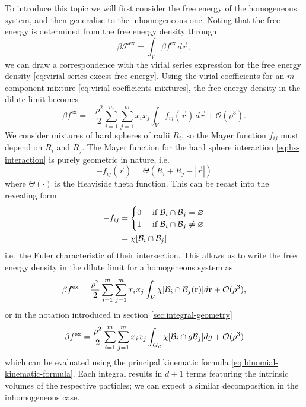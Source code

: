 To introduce this topic we will first consider the free energy of the homogeneous system, and then generalise to the inhomogeneous one.
Noting that the free energy is determined from the free energy density through
\begin{equation*}
  \beta \mathcal{F}^\mathrm{ex} = \int_V \beta f^\mathrm{ex} \, d\vec{r},
\end{equation*}
we can draw a correspondence with the virial series expression for the free energy density \eqref{eq:virial-series-excess-free-energy}.
Using the virial coefficients for an $m$-component mixture \eqref{eq:virial-coefficients-mixtures}, the free energy density in the dilute limit becomes%
\begin{equation*}
  \beta f^\mathrm{ex}
  =
  - \frac{\rho^2}{2}
  \sum_{i = 1}^m \sum_{j = 1}^m x_i x_j \int_V
  f_{ij}(\vec{r})
  \, d\vec{r}
  + \mathcal{O}(\rho^3).
\end{equation*}
We consider mixtures of hard spheres of radii $R_i$, so the Mayer function $f_{ij}$ must depend on $R_i$ and $R_j$.
The Mayer function for the hard sphere interaction \eqref{eq:hs-interaction} is purely geometric in nature, i.e.\
\begin{equation*}
  -f_{ij}(\vec{r})
  =
  \Theta(R_i + R_j - |\vec{r}|)
\end{equation*}
where $\Theta(\cdot)$ is the Heaviside theta function.
This can be recast into the revealing form
\begin{equation*}
  \begin{split}
    -f_{ij}
    &=
    \begin{cases}
      0 & \textrm{ if } \mathcal{B}_i \cap \mathcal{B}_j = \varnothing \\
      1 & \textrm{ if } \mathcal{B}_i \cap \mathcal{B}_j \ne \varnothing
    \end{cases}
    \\ &=
    \chi[\mathcal{B}_i \cap \mathcal{B}_j]
  \end{split}
\end{equation*}
i.e.\ the Euler characteristic of their intersection.
This allows us to write the free energy density in the dilute limit for a homogeneous system as
\begin{equation*}
  \beta f^\mathrm{ex}
  =
  \frac{\rho^2}{2}
  \sum_{i=1}^m \sum_{j=1}^m
  x_i x_j
  \int_V \chi[\mathcal{B}_i \cap \mathcal{B}_j(\boldsymbol{\mathbf{r}})] d\boldsymbol{\mathbf{r}}
  + \mathcal{O}(\rho^3),
\end{equation*}
or in the notation introduced in section \ref{sec:integral-geometry}
\begin{equation*}
  \beta f^\mathrm{ex}
  =
  \frac{\rho^2}{2}
  \sum_{i=1}^m \sum_{j=1}^m
  x_i x_j
  \int_{G_d} \chi[\mathcal{B}_i \cap g \mathcal{B}_j] dg
  + \mathcal{O}(\rho^3)
\end{equation*}
which can be evaluated using the principal kinematic formula \eqref{eq:binomial-kinematic-formula}.
Each integral results in $d+1$ terms featuring the intrinsic volumes of the respective particles; we can expect a similar decomposition in the inhomogeneous case.

